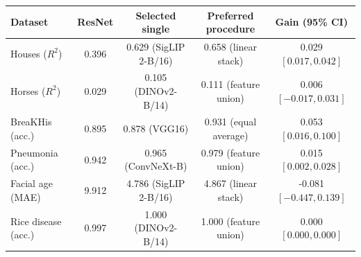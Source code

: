 \begin{tabular}{lcccc}
\toprule
Dataset & ResNet & Selected single & Preferred procedure & Gain (95\% CI)\\
\midrule
Houses ($R^2$) & 0.396 & 0.629 (SigLIP 2-B/16) & 0.658 (linear stack) & 0.029 $[0.017,0.042]$\\
Horses ($R^2$) & 0.029 & 0.105 (DINOv2-B/14) & 0.111 (feature union) & 0.006 $[-0.017,0.031]$\\
BreaKHis (acc.) & 0.895 & 0.878 (VGG16) & 0.931 (equal average) & 0.053 $[0.016,0.100]$\\
Pneumonia (acc.) & 0.942 & 0.965 (ConvNeXt-B) & 0.979 (feature union) & 0.015 $[0.002,0.028]$\\
Facial age (MAE) & 9.912 & 4.786 (SigLIP 2-B/16) & 4.867 (linear stack) & -0.081 $[-0.447,0.139]$\\
Rice disease (acc.) & 0.997 & 1.000 (DINOv2-B/14) & 1.000 (feature union) & 0.000 $[0.000,0.000]$\\
\bottomrule
\end{tabular}
